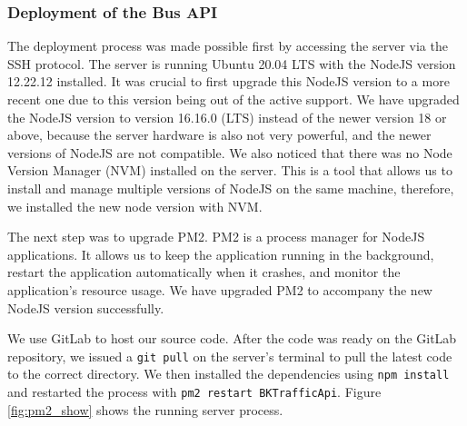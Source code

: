 \subsubsection{Deployment of the Bus API}
The deployment process was made possible first by accessing the server via the SSH protocol. The server is running Ubuntu 20.04 LTS with the NodeJS version 12.22.12 installed. It was crucial to first upgrade this NodeJS version to a more recent one due to this version being out of the active support. We have upgraded the NodeJS version to version 16.16.0 (LTS) instead of the newer version 18 or above, because the server hardware is also not very powerful, and the newer versions of NodeJS are not compatible. We also noticed that there was no Node Version Manager (NVM) installed on the server. This is a tool that allows us to install and manage multiple versions of NodeJS on the same machine, therefore, we installed the new node version with NVM.

The next step was to upgrade PM2. PM2 is a process manager for NodeJS applications. It allows us to keep the application running in the background, restart the application automatically when it crashes, and monitor the application's resource usage. We have upgraded PM2 to accompany the new NodeJS version successfully.

We use GitLab to host our source code. After the code was ready on the GitLab repository, we issued a \lstinline{git pull} on the server's terminal to pull the latest code to the correct directory. We then installed the dependencies using \lstinline{npm install} and restarted the process with \lstinline{pm2 restart BKTrafficApi}. Figure \ref{fig:pm2_show} shows the running server process.

